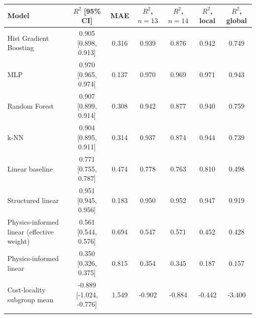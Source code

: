 \begin{tabular}{lcccccc}
\toprule
Model & $R^2$ [95\% CI] & MAE & $R^2$, $n=13$ & $R^2$, $n=14$ & $R^2$, local & $R^2$, global \\
\midrule
Hist Gradient Boosting & 0.905 [0.898, 0.913] & 0.316 & 0.939 & 0.876 & 0.942 & 0.749 \\
MLP & 0.970 [0.965, 0.974] & 0.137 & 0.970 & 0.969 & 0.971 & 0.943 \\
Random Forest & 0.907 [0.899, 0.914] & 0.308 & 0.942 & 0.877 & 0.940 & 0.759 \\
k-NN & 0.904 [0.895, 0.911] & 0.314 & 0.937 & 0.874 & 0.944 & 0.739 \\
Linear baseline & 0.771 [0.755, 0.787] & 0.474 & 0.778 & 0.763 & 0.810 & 0.498 \\
\midrule
Structured linear & 0.951 [0.945, 0.956] & 0.183 & 0.950 & 0.952 & 0.947 & 0.919 \\
Physics-informed linear (effective weight) & 0.561 [0.544, 0.576] & 0.694 & 0.547 & 0.571 & 0.452 & 0.428 \\
Physics-informed linear & 0.350 [0.326, 0.375] & 0.815 & 0.354 & 0.345 & 0.187 & 0.157 \\
Cost-locality subgroup mean & -0.889 [-1.024, -0.776] & 1.549 & -0.902 & -0.884 & -0.442 & -3.400 \\
\botrule
\end{tabular}
